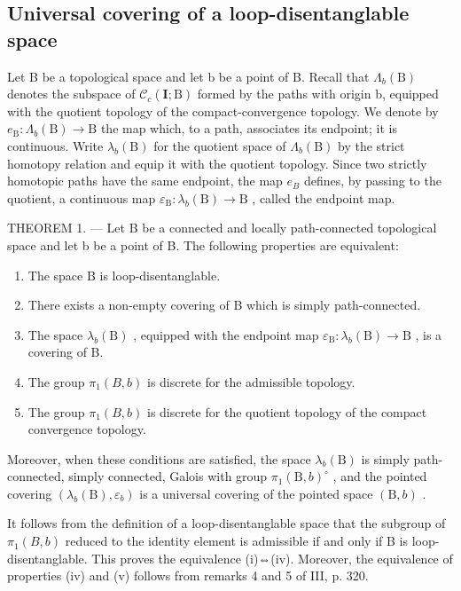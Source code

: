 \subsection{Universal covering of a loop-disentanglable space}

Let B be a topological space and let b be a point of B. Recall that \(\Lambda_{b}(\mathrm{B})\) denotes the subspace of \(\mathcal{C}_{c}(\mathbf{I};\mathrm{B})\) formed by the paths with origin b, equipped with the quotient topology of the compact-convergence topology. We denote by \(e_{\mathrm{B}}\colon\Lambda_{b}(\mathrm{B})\to\mathrm{B}\) the map which, to a path, associates its endpoint; it is continuous. Write \(\lambda_{b}(\mathrm{B})\) for the quotient space of \(\Lambda_{b}(\mathrm{B})\) by the strict homotopy relation and equip it with the quotient topology. Since two strictly homotopic paths have the same endpoint, the map \(e_{B}\) defines, by passing to the quotient, a continuous map \(\varepsilon_{\mathrm{B}}\colon\lambda_{b}(\mathrm{B})\to\mathrm{B}\) , called the endpoint map.

THEOREM 1. --- Let B be a connected and locally path-connected topological space and let b be a point of B. The following properties are equivalent:

\begin{enumerate}
\def\labelenumi{(\roman{enumi})}
\item
  The space B is loop-disentanglable.
\item
  There exists a non-empty covering of B which is simply path-connected.
\item
  The space \(\lambda_{b}(\mathrm{B})\) , equipped with the endpoint map \(\varepsilon_{\mathrm{B}}\colon\lambda_{b}(\mathrm{B})\to\mathrm{B}\) , is a covering of B.
\item
  The group \(\pi_1(B, b)\) is discrete for the admissible topology.
\item
  The group \(\pi_{1}(B,b)\) is discrete for the quotient topology of the compact convergence topology.
\end{enumerate}

Moreover, when these conditions are satisfied, the space \(\lambda_{b}(\mathrm{B})\) is simply path-connected, simply connected, Galois with group \(\pi_{1}(\mathrm{B},b)^{\circ}\) , and the pointed covering \((\lambda_{b}(\mathrm{B}),\varepsilon_{b})\) is a universal covering of the pointed space \((\mathrm{B},b)\) .

It follows from the definition of a loop-disentanglable space that the subgroup of \(\pi_{1}(B,b)\) reduced to the identity element is admissible if and only if B is loop-disentanglable. This proves the equivalence (i)⇔(iv). Moreover, the equivalence of properties (iv) and (v) follows from remarks 4 and 5 of III, p. 320.

